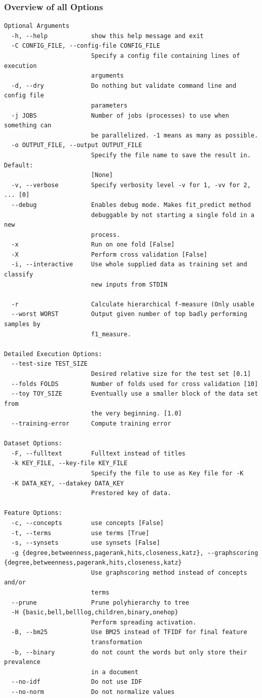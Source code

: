 \documentclass{article}
\begin{document}
\subsubsection{Overview of all Options}
\label{subsubsec:optionsoverview}
\begin{lstlisting}[basicstyle=\ttfamily]
Optional Arguments
  -h, --help            show this help message and exit
  -C CONFIG_FILE, --config-file CONFIG_FILE
                        Specify a config file containing lines of execution
                        arguments
  -d, --dry             Do nothing but validate command line and config file
                        parameters
  -j JOBS               Number of jobs (processes) to use when something can
                        be parallelized. -1 means as many as possible.
  -o OUTPUT_FILE, --output OUTPUT_FILE
                        Specify the file name to save the result in. Default:
                        [None]
  -v, --verbose         Specify verbosity level -v for 1, -vv for 2, ... [0]
  --debug               Enables debug mode. Makes fit_predict method
                        debuggable by not starting a single fold in a new
                        process.
  -x                    Run on one fold [False]
  -X                    Perform cross validation [False]
  -i, --interactive     Use whole supplied data as training set and classify
                        new inputs from STDIN

  -r                    Calculate hierarchical f-measure (Only usable
  --worst WORST         Output given number of top badly performing samples by
                        f1_measure.

Detailed Execution Options:
  --test-size TEST_SIZE
                        Desired relative size for the test set [0.1]
  --folds FOLDS         Number of folds used for cross validation [10]
  --toy TOY_SIZE        Eventually use a smaller block of the data set from
                        the very beginning. [1.0]
  --training-error      Compute training error

Dataset Options:
  -F, --fulltext        Fulltext instead of titles
  -k KEY_FILE, --key-file KEY_FILE
                        Specify the file to use as Key file for -K
  -K DATA_KEY, --datakey DATA_KEY
                        Prestored key of data.

Feature Options:
  -c, --concepts        use concepts [False]
  -t, --terms           use terms [True]
  -s, --synsets         use synsets [False]
  -g {degree,betweenness,pagerank,hits,closeness,katz}, --graphscoring {degree,betweenness,pagerank,hits,closeness,katz}
                        Use graphscoring method instead of concepts and/or
                        terms
  --prune               Prune polyhierarchy to tree
  -H {basic,bell,belllog,children,binary,onehop}
                        Perform spreading activation.
  -B, --bm25            Use BM25 instead of TFIDF for final feature
                        transformation
  -b, --binary          do not count the words but only store their prevalence
                        in a document
  --no-idf              Do not use IDF
  --no-norm             Do not normalize values


\end{lstlisting}
\end{document}
